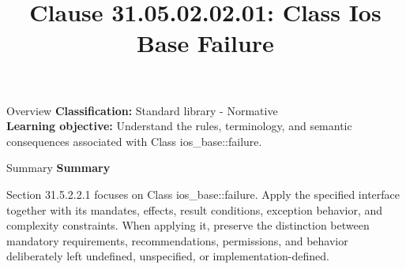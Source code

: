 \documentclass[10pt,letterpaper]{article}
\title{Clause 31.05.02.02.01: Class Ios Base Failure}
\author{}
\date{}
\begin{document}
\maketitle
\begin{CornellOverviewBox}{Overview}
\textbf{Classification:} Standard library - Normative\\[2pt]
\textbf{Learning objective:} Understand the rules, terminology, and semantic consequences associated with Class ios\_base::failure.
\end{CornellOverviewBox}\begin{CornellSummaryBox}{Summary}
{\sffamily\bfseries\color{Accent} Summary}\par\vspace{3pt}Section 31.5.2.2.1 focuses on Class ios\_base::failure. Apply the specified interface together with its mandates, effects, result conditions, exception behavior, and complexity constraints. When applying it, preserve the distinction between mandatory requirements, recommendations, permissions, and behavior deliberately left undefined, unspecified, or implementation-defined.
\end{CornellSummaryBox}
\end{document}
